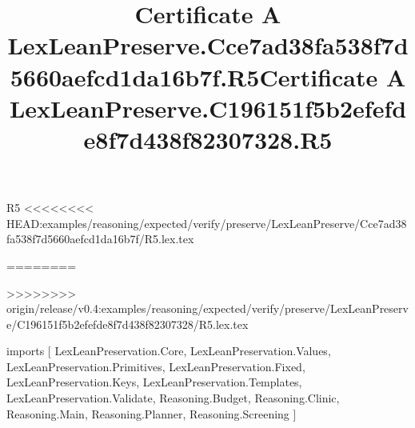 \begin{lexlean}{R5}
<<<<<<<< HEAD:examples/reasoning/expected/verify/preserve/LexLeanPreserve/Cce7ad38fa538f7d5660aefcd1da16b7f/R5.lex.tex
\title{Certificate A LexLeanPreserve.Cce7ad38fa538f7d5660aefcd1da16b7f.R5}
========
\title{Certificate A LexLeanPreserve.C196151f5b2efefde8f7d438f82307328.R5}
>>>>>>>> origin/release/v0.4:examples/reasoning/expected/verify/preserve/LexLeanPreserve/C196151f5b2efefde8f7d438f82307328/R5.lex.tex
\begin{coremodule}
imports [
  LexLeanPreservation.Core,
  LexLeanPreservation.Values,
  LexLeanPreservation.Primitives,
  LexLeanPreservation.Fixed,
  LexLeanPreservation.Keys,
  LexLeanPreservation.Templates,
  LexLeanPreservation.Validate,
  Reasoning.Budget,
  Reasoning.Clinic,
  Reasoning.Main,
  Reasoning.Planner,
  Reasoning.Screening
]


\end{coremodule}
\end{lexlean}
